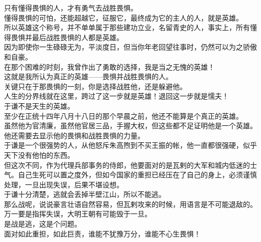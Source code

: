 \begin{multicols}{\theparacolNo}
只有懂得畏惧的人，才有勇气去战胜畏惧。\\

懂得畏惧的可怕，还能超越它，征服它，最终成为它的主人的人，就是英雄。\\

所以英雄这个称号，并不单单属于那些建功立业，名留青史的人，事实上，所有懂得畏惧并最后战胜畏惧的人都是英雄。\\

因为即使你一生碌碌无为，平淡度日，但当你年老回望往事时，仍然可以为之骄傲和自豪。\\

在那个困难的时刻，我曾作出了勇敢的选择，我是当之无愧的英雄！\\

这就是我所认为真正的英雄——畏惧并战胜畏惧的人。\\

关键只在于那畏惧的一刻，你是选择战胜他，还是躲避他。\\

人生的分界线就在这里，跨过了这一步就是英雄！退回这一步就是懦夫！\\

于谦不是天生的英雄。\\

至少在正统十四年八月十八日的那个早晨之前，他还不能算是个真正的英雄。\\

虽然他为官清廉，虽然他官居三品，手握大权，但这些都不足证明他是一个英雄。\\

他还需要去显示他的畏惧和战胜畏惧的力量。\\

于谦是一个很强势的人，从他怒斥朱高煦到不买王振的帐，他一直都很强硬，似乎天下没有他怕的东西。\\

但这次不同，作为代理兵部事务的侍郎，他要面对的是瓦剌的大军和城内低迷的士气。自己生死可以置之度外，但如今国家的重担已经压在了自己的身上，必须谨慎处理，一旦出现失误，后果不堪设想。\\

于谦十分清楚，逃就会丢掉半壁江山，所以不能逃。\\

那么战呢，说说豪言壮语自然容易，但瓦剌攻来的时候，用语言是不可能退敌的。万一要是指挥失误，大明王朝有可能毁于一旦。\\

是战是逃，这是个问题。\\

面对如此重担，如此巨责，谁能不犹豫万分，谁能不心生畏惧！\\


\end{multicols}
